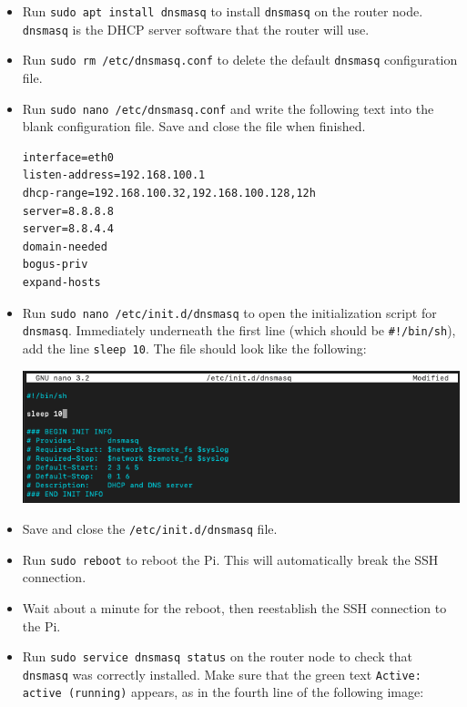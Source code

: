 \documentclass{article}
\begin{document}
\begin{itemize}
    \item Run \texttt{sudo apt install dnsmasq} to install \texttt{dnsmasq} on the router node. \texttt{dnsmasq} is the DHCP server software that the router will use.
    
    \item Run \texttt{sudo rm /etc/dnsmasq.conf} to delete the default \texttt{dnsmasq} configuration file.
    
    \item Run \texttt{sudo nano /etc/dnsmasq.conf} and write the following text into the blank configuration file. Save and close the file when finished.

\begin{verbatim}
interface=eth0
listen-address=192.168.100.1
dhcp-range=192.168.100.32,192.168.100.128,12h
server=8.8.8.8
server=8.8.4.4
domain-needed
bogus-priv
expand-hosts
\end{verbatim}    

    \item Run \texttt{sudo nano /etc/init.d/dnsmasq} to open the initialization script for \texttt{dnsmasq}. Immediately underneath the first line (which should be \texttt{\#!/bin/sh}), add the line \texttt{sleep 10}. The file should look like the following:
    
    \includegraphics[width=\textwidth]{images/dnsmasq-sleep.png}
    
    \item Save and close the \texttt{/etc/init.d/dnsmasq} file.
    
    \item Run \texttt{sudo reboot} to reboot the Pi. This will automatically break the SSH connection.
    
    \item Wait about a minute for the reboot, then reestablish the SSH connection to the Pi.
    
    \item Run \texttt{sudo service dnsmasq status} on the router node to check that \texttt{dnsmasq} was correctly installed. Make sure that the green text \texttt{Active: active (running)} appears, as in the fourth line of the following image:
    

\end{itemize}
\end{document}
